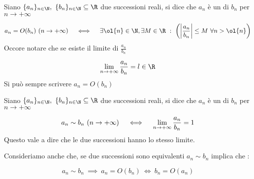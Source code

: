 \documentclass[../appunti.tex]{subfiles}
\begin{document}
\begin{defn}[O grande]
Siano $ \{ a_n \}_{n \in \N},\ \{ b_n \}_{n \in \N} \subseteq \R $ due successioni
reali, si dice che $a_n$ è un  di $b_n$ per $n \to + \infty$

\begin{equation}
	a_n = O(b_n)\ (n \to + \infty) \quad \iff \quad
	\exists \ol{n} \in \N, \exists M \in \R\ :\ \left(
	\left|\frac{a_n}{b_n}\right| \leq M\ \forall n > \ol{n} \right)
\end{equation}
Occore notare che se esiste il limite di $ \frac{a_n}{b_n} $


\begin{equation}
	\limm \frac{a_n}{b_n} = l \in \R
\end{equation}
Si può sempre scrivere $ a_n = O(b_n)$
\end{defn}

\begin{defn}
Siano $ \{ a_n \}_{n \in \N},\ \{ b_n \}_{n \in \N} \subseteq \R $ due successioni
reali, si dice che $a_n$ è un  di $b_n$ per $n \to + \infty$


\begin{equation}
	a_n \sim b_n \ (n \to + \infty) \quad \iff \quad
	\lim \limits_{n \to + \infty} \frac{a_n}{b_n} = 1
\end{equation}
Questo vale a dire che le due successioni hanno lo stesso limite.\\ 
\end{defn}
Consideriamo anche che, se due successioni sono equivalenti $ a_n \sim b_n $ implica
che :


\begin{equation} 
	a_n \sim b_n\ \implies \ a_n = O(b_n)\ \iff\ b_n=  O(a_n) 
\end{equation}
\end{document}
